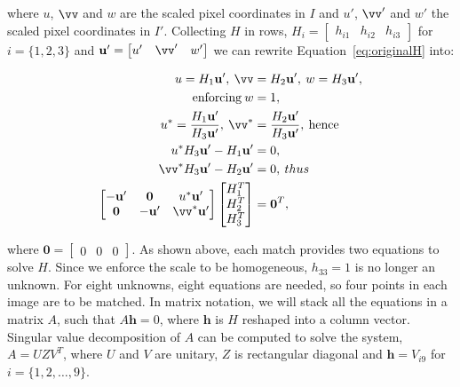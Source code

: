 \documentclass[12pt]{article}
\begin{document}
where $u$, $\vv$ and $w$ are the scaled pixel coordinates in $I$ and $u'$, $\vv'$ and $w'$ the scaled pixel coordinates in $I'$.
Collecting $H$ in rows, $H_i = \begin{bmatrix} h_{i1} & h_{i2} & h_{i3} \end{bmatrix}$ for $i = \lbrace 1,2,3 \rbrace$ and $\mathbf{u'} = \begin{bmatrix} u' & \vv' & w' \end{bmatrix}$ we can rewrite Equation~\ref{eq:originalH} into:

\begin{equation}
\begin{aligned}
	u = H_1 \mathbf{u'}, \: \vv &= H_2 \mathbf{u'}, \: w = H_3 \mathbf{u'}, \\ 
	\text{enforcing} \: w &= 1, \\
	u^* = \frac{H_1 \mathbf{u'}}{ H_3 \mathbf{u'}}, \: \vv^* &= \frac{H_2 \mathbf{u'}}{ H_3 \mathbf{u'}}, \: \text{hence} \\	
	u^*H_3\mathbf{u'} - H_1\mathbf{u'} &= 0, \\
	\vv^* H_3\mathbf{u'} - H_2\mathbf{u'} &= 0, \: thus\\
	\begin{bmatrix}
	-\mathbf{u'} & \mathbf{0} & u^*\mathbf{u'} \\
	\mathbf{0} & -\mathbf{u'} & \vv^*\mathbf{u'}
	\end{bmatrix}
	\begin{bmatrix}
	H_1^T \\
	H_2^T \\ 
	H_3^T 
	\end{bmatrix}
	&= \mathbf{0}^T,
\end{aligned}
\label{eq:derivatingH}
\end{equation}

where $\mathbf{0} = \begin{bmatrix} 0 & 0 & 0 \end{bmatrix}$. 
As shown above, each match provides two equations to solve $H$.
Since we enforce the scale to be homogeneous, $h_{33} = 1$ is no longer an unknown.
For eight unknowns, eight equations are needed, so four points in each image are to be matched.
In matrix notation, we will stack all the equations in a matrix $A$, such that $A\mathbf{h}=0$, where $\mathbf{h}$ is $H$ reshaped into a column vector.
Singular value decomposition of $A$ can be computed to solve the system, $A = UZV^T$, where $U$ and $V$ are unitary, $Z$ is rectangular diagonal and $\mathbf{h} = V_{i9}$ for $i = \lbrace 1,2, \ldots, 9 \rbrace$.
\end{document}
